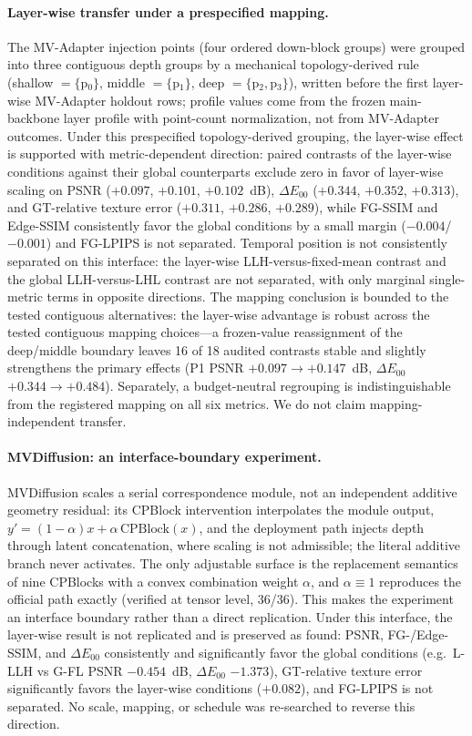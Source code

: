 \documentclass[times,twocolumn,final]{elsarticle}
\begin{document}
\paragraph{Layer-wise transfer under a prespecified mapping.}
The MV-Adapter injection points (four ordered down-block groups) were grouped
into three contiguous depth groups by a mechanical topology-derived rule
(shallow $=\{$p$_0\}$, middle $=\{$p$_1\}$, deep $=\{$p$_2,$p$_3\}$),
written before the first layer-wise MV-Adapter holdout rows; profile values
come from the frozen main-backbone layer profile with point-count
normalization, not from MV-Adapter outcomes. Under this prespecified
topology-derived grouping, the layer-wise effect is supported with
metric-dependent direction: paired contrasts of the layer-wise conditions
against their global counterparts exclude zero in favor of layer-wise
scaling on PSNR ($+0.097$, $+0.101$, $+0.102$~dB), $\Delta E_{00}$
($+0.344$, $+0.352$, $+0.313$), and GT-relative texture error ($+0.311$,
$+0.286$, $+0.289$), while FG-SSIM and Edge-SSIM consistently favor the
global conditions by a small margin ($-0.004$/$-0.001$) and FG-LPIPS is not
separated. Temporal position is not consistently separated on this
interface: the layer-wise LLH-versus-fixed-mean contrast and the global
LLH-versus-LHL contrast are not separated, with only marginal single-metric
terms in opposite directions. The mapping conclusion is bounded to the
tested contiguous alternatives: the layer-wise advantage is robust across
the tested contiguous mapping choices---a frozen-value reassignment of the
deep/middle boundary leaves 16 of 18 audited contrasts stable and slightly
strengthens the primary effects (P1 PSNR $+0.097\to+0.147$~dB,
$\Delta E_{00}$ $+0.344\to+0.484$). Separately, a budget-neutral
regrouping is indistinguishable from the registered mapping on all six
metrics. We do not claim mapping-independent transfer.

\paragraph{MVDiffusion: an interface-boundary experiment.}
MVDiffusion scales a serial correspondence module, not an independent
additive geometry residual: its CPBlock intervention interpolates the module
output, $y'=(1-\alpha)x+\alpha\,\mathrm{CPBlock}(x)$, and the deployment
path injects depth through latent concatenation, where scaling is not
admissible; the literal additive branch never activates. The only adjustable
surface is the replacement semantics of nine CPBlocks with a convex
combination weight $\alpha$, and $\alpha\equiv 1$ reproduces the official
path exactly (verified at tensor level, 36/36). This makes the experiment an
interface boundary rather than a direct replication. Under this interface,
the layer-wise result is not replicated and is preserved as found: PSNR,
FG-/Edge-SSIM, and $\Delta E_{00}$ consistently and significantly favor the
global conditions (e.g.\ L-LLH vs G-FL PSNR $-0.454$~dB, $\Delta E_{00}$
$-1.373$), GT-relative texture error significantly favors the layer-wise
conditions ($+0.082$), and FG-LPIPS is not separated. No scale, mapping, or
schedule was re-searched to reverse this direction.
\end{document}
